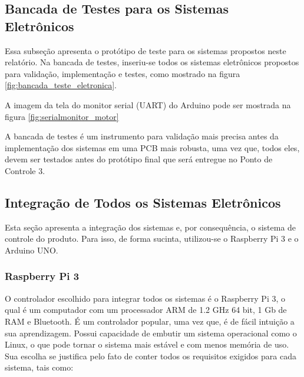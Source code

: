 \subsection{Bancada de Testes para os Sistemas Eletrônicos}

Essa subseção apresenta o protótipo de teste para os sistemas propostos neste relatório. Na bancada de testes, inseriu-se todos os sistemas eletrônicos propostos para validação, implementação e testes, como mostrado na figura  \ref{fig:bancada_teste_eletronica}.


A imagem da tela do monitor serial (UART) do Arduino pode ser mostrada na figura \ref{fig:serialmonitor_motor}


A bancada de testes é um instrumento para validação mais precisa antes da implementação dos sistemas em uma PCB mais robusta, uma vez que, todos eles, devem ser testados antes do protótipo final que será entregue no Ponto de Controle 3.

\subsection{Integração de Todos os Sistemas Eletrônicos}
 Esta seção apresenta a integração dos sistemas e, por consequência, o sistema de controle do produto. Para isso, de forma sucinta,  utilizou-se o Raspberry Pi 3 e o Arduino UNO.

\subsubsection{Raspberry Pi 3}

O controlador escolhido para integrar todos os sistemas é o Raspberry Pi 3, o qual é um computador com um processador ARM de 1.2 GHz 64 bit, 1 Gb de RAM e Bluetooth. É um controlador popular, uma vez que, é de fácil intuição a sua aprendizagem. Possui capacidade de embutir um sistema operacional como o Linux, o que pode tornar o sistema mais estável e com menos memória de uso. Sua escolha se justifica pelo fato de conter todos os requisitos exigidos para cada sistema, tais como:

